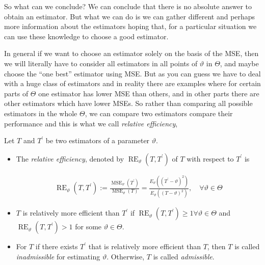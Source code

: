 \documentclass[ 11pt,%
				a4paper,%
				twoside,%
				headinclude,%
				footinclude = true,%
				cleardoublepage = empty,%
				reqno]{scrbook}
\begin{document}


So what can we conclude? We can conclude that there is no absolute answer to obtain an estimator. But what we can do is we can gather different and perhaps more information about the estimators hoping that, for a particular situation we can use these knowledge to choose a good estimator.

In general if we want to choose an estimator solely on the basis of the MSE, then we will literally have to consider all estimators in all points of $\vartheta$ in $\Theta$, and maybe choose the ``one best'' estimator using MSE. But as you can guess we have to deal with a huge class of estimators and in reality there are examples where for certain parts of $\Theta$ one estimator has lower MSE than others, and in other parts there are other estimators which have lower MSEs. So rather than comparing all possible estimators in the whole $\Theta$, we can compare two estimators compare their performance and this is what we call \emph{relative efficiency},


\begin{definition}
 Let $T$ and $T^{'}$ be two estimators of a parameter $\vartheta$. 
\begin{itemize}
  \item The \emph{relative efficiency}, denoted by $\operatorname{RE}_{\vartheta}\left(T, T^{'}\right)$ of $T$ with respect to $T^{'}$ is 

\begin{align*}
  \operatorname{RE}_{\vartheta}\left(T, T^{'}\right):=\frac{\operatorname{MSE}_{\vartheta}\left(T^{'}\right)}{\operatorname{MSE}_{\vartheta}(T)}=\frac{E_{\vartheta}\left(\left(T^{'}-\vartheta\right)^{2}\right)}{E_{\vartheta}\left(\left(T-\vartheta\right)^{2}\right)}, \quad \forall \vartheta \in \Theta
\end{align*}

\item $T$ is relatively more efficient than $T^{'}$ if $\operatorname{RE}_{\vartheta}\left(T, T^{'}\right) \geq 1 \forall \vartheta \in \Theta$ and $\operatorname{RE}_{\vartheta}\left(T, T^{'}\right) >1$ for some $\vartheta \in \Theta$.

\item For $T$ if there exists $T^{'}$ that is relatively more efficient than $T$, then $T$ is called \emph{inadmissible} for estimating $\vartheta$. Otherwise, $T$ is called \emph{admissible}.


\end{itemize}
  
\end{definition}
\end{document}
